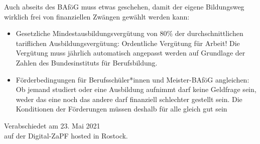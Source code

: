 \documentclass[DIV=calc]{scrartcl}
\begin{document}
Auch abseits des BAföG muss etwas geschehen, damit der eigene Bildungsweg wirklich frei von finanziellen Zwängen gewählt werden kann:

\begin{itemize}
    \item Gesetzliche Mindestausbildungsvergütung von 80\% der durchschnittlichen tariflichen Ausbildungsvergütung: Ordentliche Vergütung für Arbeit! Die Vergütung muss jährlich automatisch angepasst werden auf Grundlage der Zahlen des Bundesinstituts für Berufsbildung.

    \item Förderbedingungen für Berufsschüler*innen und Meister-BAföG angleichen: Ob jemand studiert oder eine Ausbildung aufnimmt darf keine Geldfrage sein, weder das eine noch das andere darf finanziell schlechter gestellt sein. Die Konditionen der Förderungen müssen deshalb für alle gleich gut sein
\end{itemize}

\vfill
\begin{flushright}
	Verabschiedet am 23. Mai 2021 \\
	auf der Digital-ZaPF hosted in Rostock.
\end{flushright}
\end{document}

